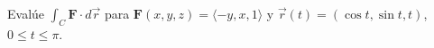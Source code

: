Evalúe $\int_C\mathbf{F}\cdot d\vec r$ para $\mathbf{F}(x,y,z)=\langle-y,x,1\rangle$ y $\vec r(t)=(\cos t,\sin t,t)$, $0\leq t\leq\pi$.
